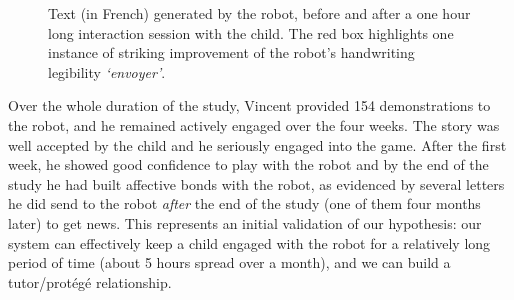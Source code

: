 \documentclass{article}
\begin{document}
\begin{figure}
    \centering

    \caption{\small Text (in French) generated by the robot, before and after a one
        hour long interaction session with the child. The red box
        highlights one instance of striking improvement of the robot's
        handwriting legibility \emph{`envoyer'}.}

    \label{fig:stimuli}
\end{figure}

Over the whole duration of the study, Vincent provided 154 demonstrations to
the robot, and he remained actively engaged over the four weeks. The story was
well accepted by the child and he seriously engaged into the game. After the
first week, he showed good confidence to play with the robot and by the end of
the study he had built affective bonds with the robot, as evidenced by several
letters he did send to the robot \emph{after} the end of the study (one of them
four months later) to get news. This represents an initial validation of our
hypothesis: our system can effectively keep a child engaged with the robot for a
relatively long period of time (about 5 hours spread over a month), and we can
build a tutor/protégé relationship.
\end{document}
